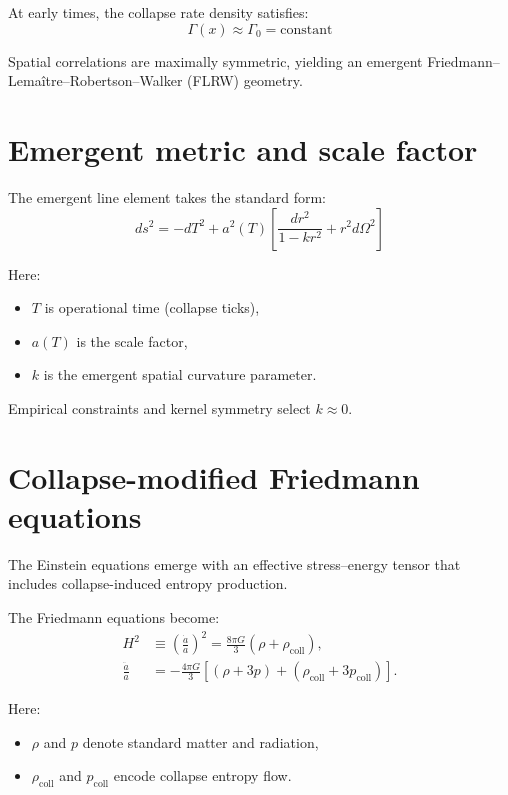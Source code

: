 \documentclass[11pt]{book}
\begin{document}
At early times, the collapse rate density satisfies:
\begin{equation}
\Gamma(x) \approx \Gamma_0 = \text{constant}
\end{equation}

Spatial correlations are maximally symmetric, yielding an emergent
Friedmann--Lemaître--Robertson--Walker (FLRW) geometry.

\section{Emergent metric and scale factor}

The emergent line element takes the standard form:
\begin{equation}
ds^2 = -dT^2 + a^2(T)\left[
\frac{dr^2}{1-kr^2} + r^2 d\Omega^2
\right]
\end{equation}

Here:
\begin{itemize}
\item $T$ is operational time (collapse ticks),
\item $a(T)$ is the scale factor,
\item $k$ is the emergent spatial curvature parameter.
\end{itemize}

Empirical constraints and kernel symmetry select $k \approx 0$.

\section{Collapse-modified Friedmann equations}

The Einstein equations emerge with an effective stress--energy tensor
that includes collapse-induced entropy production.

The Friedmann equations become:
\begin{align}
H^2 &\equiv \left(\frac{\dot a}{a}\right)^2
= \frac{8\pi G}{3}\left(\rho + \rho_{\mathrm{coll}}\right), \\
\frac{\ddot a}{a}
&= -\frac{4\pi G}{3}
\left[
(\rho + 3p) + (\rho_{\mathrm{coll}} + 3p_{\mathrm{coll}})
\right].
\end{align}

Here:
\begin{itemize}
\item $\rho$ and $p$ denote standard matter and radiation,
\item $\rho_{\mathrm{coll}}$ and $p_{\mathrm{coll}}$ encode collapse entropy flow.
\end{itemize}
\end{document}
